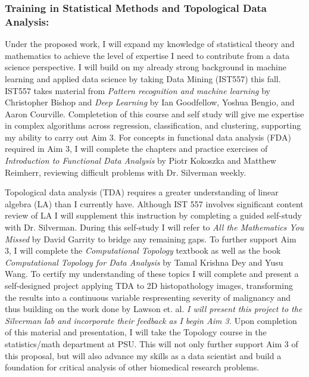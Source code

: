 \documentclass{NIHGrant}
\begin{document}
\subsubsection*{Training in Statistical Methods and Topological Data Analysis:}
Under the proposed work, I will expand my knowledge of statistical theory and mathematics to achieve the level of expertise I need to contribute from a data science perspective. I will build on my already strong background in machine learning and applied data science by taking Data Mining (IST557) this fall. IST557 takes material from \textit{Pattern recognition and machine learning} by Christopher Bishop and \textit{Deep Learning} by Ian Goodfellow, Yoshua Bengio, and Aaron Courville. Completetion of this course and self study will give me expertise in complex algorithms across regression, classification, and clustering, supporting my ability to carry out Aim 3. For concepts in functional data analysis (FDA) required in Aim 3, I will complete the chapters and practice exercises of \textit{Introduction to Functional Data Analysis} by Piotr Kokoszka and Matthew Reimherr, reviewing difficult problems with Dr. Silverman weekly.

Topological data analysis (TDA) requires a greater understanding of linear algebra (LA) than I currently have. Although IST 557 involves significant content review of LA I will supplement this instruction by completing a guided self-study with Dr. Silverman. During this self-study I will refer to \textit{All the Mathematics You Missed} by David Garrity to bridge any remaining gaps. To further support Aim 3, I will complete the \textit{Computational Topology} textbook as well as the book \textit{Computational Topology for Data Analysis} by Tamal Krishna Dey and Yusu Wang. To certify my understanding of these topics I will complete and present a self-designed project applying TDA to 2D histopathology images, transforming the results into a continuous variable respresenting severity of malignancy and thus building on the work done by Lawson et. al. \emph{I will present this project to the Silverman lab and incorporate their feedback as I begin Aim 3.} Upon completion of this material and presentation, I will take the Topology course in the statistics/math department at PSU. This will not only further support Aim 3 of this proposal, but will also advance my skills as a data scientist and build a foundation for critical analysis of other biomedical research problems.
\end{document}
